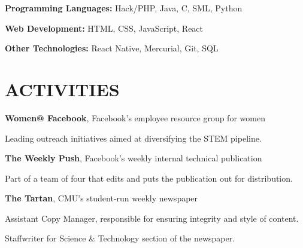 \documentclass[margin, 11pt]{res} %
\begin{document}
\begin{resume}
{\bf Programming Languages:}
Hack/PHP, Java, C, SML, Python

\vspace{5pt}

{\bf Web Development:}
HTML, CSS, JavaScript, React

\vspace{5pt}

{\bf Other Technologies:}
React Native, Mercurial, Git, SQL


\section{ACTIVITIES}

{\bf Women@ Facebook}, Facebook's employee resource group for women

\begin{itemize} \itemsep -2pt
{\small 
\item Leading outreach initiatives aimed at diversifying the STEM pipeline.}
\end{itemize}

\vspace{3pt}

{\bf The Weekly Push}, Facebook's weekly internal technical publication

\begin{itemize} \itemsep -2pt
{\small \item Part of a team of four that edits and puts the publication out for distribution.}
\end{itemize}

\vspace{3pt}

{\bf The Tartan}, CMU's student-run weekly newspaper

\begin{itemize} \itemsep -2pt
{\small \item Assistant Copy Manager, responsible for ensuring integrity and style of content.
\item Staffwriter for Science \& Technology section of the newspaper.}
\end{itemize}


\end{resume}
\end{document}
